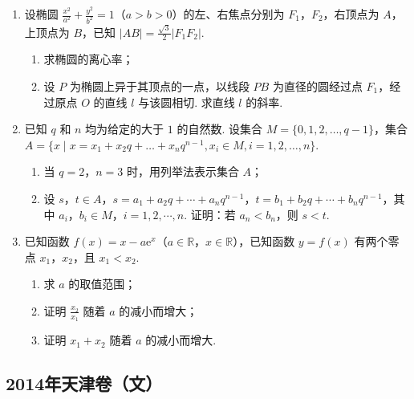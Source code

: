 \begin{description}
\begin{enumerate}[leftmargin=5pt]
        \item 设椭圆 \(\frac{x^2}{a^2}+\frac{y^2}{b^2}=1\)（\(a>b>0\)）的左、右焦点分别为 \(F_1\)，\(F_2\)，右顶点为 \(A\)，上顶点为 \(B\)，已知 \(|AB|=\frac{\sqrt3}{2}|F_1F_2|\).

\begin{enumerate}
\item 求椭圆的离心率；
\item 设 \(P\) 为椭圆上异于其顶点的一点，以线段 \(PB\) 为直径的圆经过点 \(F_1\)，经过原点 \(O\) 的直线 \(l\) 与该圆相切. 求直线 \(l\) 的斜率.
\end{enumerate}

        \item 已知 \(q\) 和 \(n\) 均为给定的大于 \(1\) 的自然数. 设集合 \(M = \{0, 1, 2, \dots, q - 1\}\)，集合 \(A = \{x \mid x = x_1 + x_2q + \dots + x_nq^{n-1}, x_i \in M, i = 1, 2, \dots, n\}\).

\begin{enumerate}
\item 当 \(q = 2\)，\(n = 3\) 时，用列举法表示集合 \(A\)；
\item 设 \(s\)，\(t \in A\)，\(s = a_1 + a_2q + \cdots + a_nq^{n-1}\)，\(t = b_1 + b_2q + \cdots + b_nq^{n-1}\)，其中 \(a_i\)，\(b_i \in M\)，\(i = 1,2,\cdots,n\). 证明：若 \(a_n < b_n\)，则 \(s < t\).
\end{enumerate}

        \item 已知函数 \(f(x)=x-a{\mathrm{e}}^{x}\)（\(a\in\mathbb{R}\)，\(x\in\mathbb{R}\)），已知函数 \(y=f(x)\) 有两个零点 \(x_1\)，\(x_2\)，且 \(x_1<x_2\).

\begin{enumerate}
\item 求 \(a\) 的取值范围；
\item 证明 \(\frac{x_2}{x_1}\) 随着 \(a\) 的减小而增大；
\item 证明 \(x_1+x_2\) 随着 \(a\) 的减小而增大.
\end{enumerate}

    \end{enumerate}

\end{description}


\subsection{2014年天津卷（文）}\label{gk:2014年天津卷（文）}


